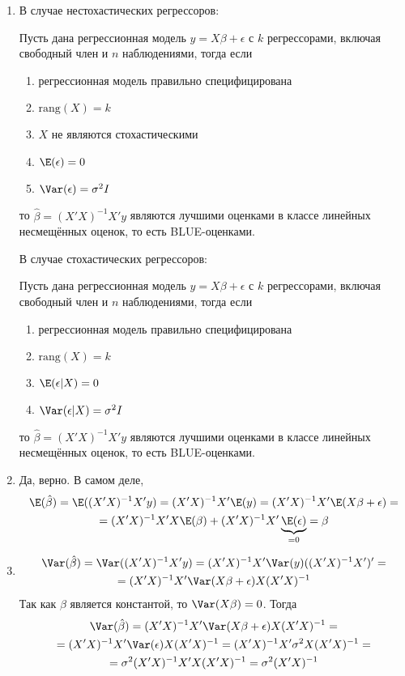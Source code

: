 \documentclass[pdftex,11pt,openany]{book}\usepackage[]{graphicx}\usepackage[]{color}
\begin{document}
\begin{solution}
\begin{enumerate}
\item 
В случае нестохастических регрессоров:

Пусть дана регрессионная модель $y=X\beta+\epsilon$ с $k$ регрессорами, включая свободный член и $n$ наблюдениями, тогда если
\begin{enumerate}
\item регрессионная модель правильно специфицирована
\item $\text{rang}(X)=k$
\item $X$ не являются стохастическими
\item $\E(\epsilon)=0$
\item $\Var(\epsilon)=\sigma^2 I$
\end{enumerate}
то $\hat\beta=(X'X)^{-1}X'y$ являются лучшими оценками в классе линейных несмещённых оценок, то есть BLUE-оценками.

В случае стохастических регрессоров:

Пусть дана регрессионная модель $y=X\beta+\epsilon$ с $k$ регрессорами, включая свободный член и $n$ наблюдениями, тогда если
\begin{enumerate}
\item регрессионная модель правильно специфицирована
\item $\text{rang}(X)=k$
\item $\E(\epsilon|X)=0$
\item $\Var(\epsilon|X)=\sigma^2 I$
\end{enumerate}
то $\hat\beta=(X'X)^{-1}X'y$ являются лучшими оценками в классе линейных несмещённых оценок, то есть BLUE-оценками.

\item
Да, верно. В самом деле, 
\begin{multline*}
\E(\hat\beta)=\E((X'X)^{-1}X'y)=(X'X)^{-1}X'\E(y)=(X'X)^{-1}X'\E(X\beta+\epsilon)=\\
=(X'X)^{-1}X'X\E(\beta)+(X'X)^{-1}X'\underbrace{\E(\epsilon)}_{=0}=\beta
\end{multline*}


\item
\begin{multline*}
\Var(\hat\beta)=\Var((X'X)^{-1}X'y)=(X'X)^{-1}X'\Var(y)((X'X)^{-1}X')'=\\
=(X'X)^{-1}X'\Var(X\beta+\epsilon)X(X'X)^{-1}
\end{multline*}
Так как $\beta$ является константой, то $\Var(X\beta)=0$. Тогда 
\begin{multline*}
\Var(\hat\beta)=(X'X)^{-1}X'\Var(X\beta+\epsilon)X(X'X)^{-1}=\\=(X'X)^{-1}X'\Var(\epsilon)X(X'X)^{-1}=
(X'X)^{-1}X'\sigma^2X(X'X)^{-1}=\\=\sigma^2(X'X)^{-1}X'X(X'X)^{-1}=\sigma^2(X'X)^{-1}
\end{multline*}
\end{enumerate}

\end{solution}
\end{document}
